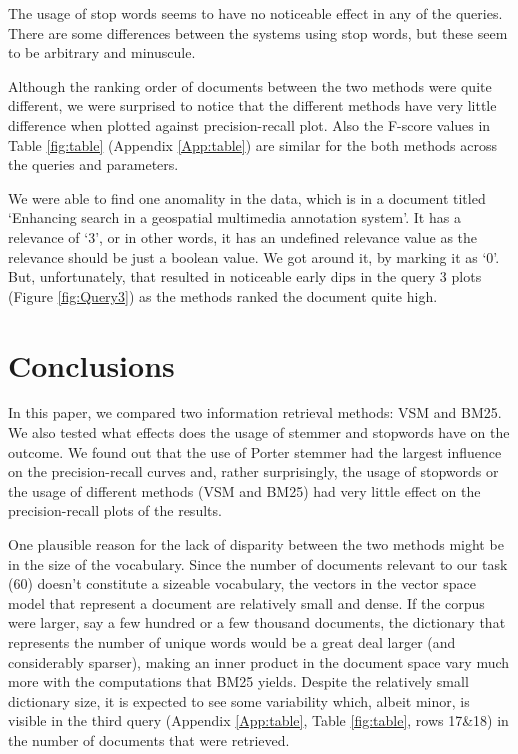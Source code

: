 The usage of stop words seems to have no noticeable effect in any of the queries. There are some differences between the systems using stop words, but these seem to be arbitrary and minuscule. 

Although the ranking order of documents between the two methods were quite different, we were surprised to notice that the different methods have very little difference when plotted against precision-recall plot. Also the F-score values in Table \ref{fig:table} (Appendix \ref{App:table}) are similar for the both methods across the queries and parameters.

We were able to find one anomality in the data, which is in a document titled \lq Enhancing search in a geospatial multimedia annotation system'. It has a relevance of \lq 3', or in other words, it has an undefined relevance value as the relevance should be just a boolean value. We got around it, by marking it as \lq 0'. But, unfortunately, that resulted in noticeable early dips in the query 3 plots (Figure \ref{fig:Query3}) as the methods ranked the document quite high.

\section{Conclusions}

In this paper, we compared two information retrieval methods: VSM and BM25. We also tested what effects does the usage of stemmer and stopwords have on the outcome. We found out that the use of Porter stemmer had the largest influence on the precision-recall curves and, rather surprisingly, the usage of stopwords or the usage of different methods (VSM and BM25) had very little effect on the precision-recall plots of the results. 

One plausible reason for the lack of disparity between the two methods might be in the size of the vocabulary. Since the number of documents relevant to our task (60) doesn't constitute a sizeable vocabulary, the vectors in the vector space model that represent a document are relatively small and dense. If the corpus were larger, say a few hundred or a few thousand documents, the dictionary that represents the number of unique words would be a great deal larger (and considerably sparser), making an inner product in the document space vary much more with the computations that BM25 yields. Despite the relatively small dictionary size, it is expected to see some variability which, albeit minor, is visible in the third query (Appendix \ref{App:table}, Table \ref{fig:table}, rows 17\&18) in the number of documents that were retrieved. 

